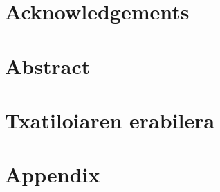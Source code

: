 \documentclass[a4paper, 11pt, twoside]{memoir}
\title{\izenburua}
\author{\egilea}
\date{\data}
\begin{document}
	
	
%

\cleardoublepage



%
%




\cleardoublepage
\frontmatter


\chapter*{Acknowledgements}

\cleardoublepage


\chapter*{Abstract}

\cleardoublepage


\tableofcontents
\clearpage
\listoffigures
\clearpage
\listoftables
\clearpage
\listofalgorithms
{}



\cleardoublepage
\mainmatter
\pagestyle{ruled}

\chapter{Txatiloiaren erabilera} \label{ch:txantiloia}

\cleardoublepage


\backmatter
\appendix

\chapter{Appendix} \label{ch:eranskina}




\end{document}

